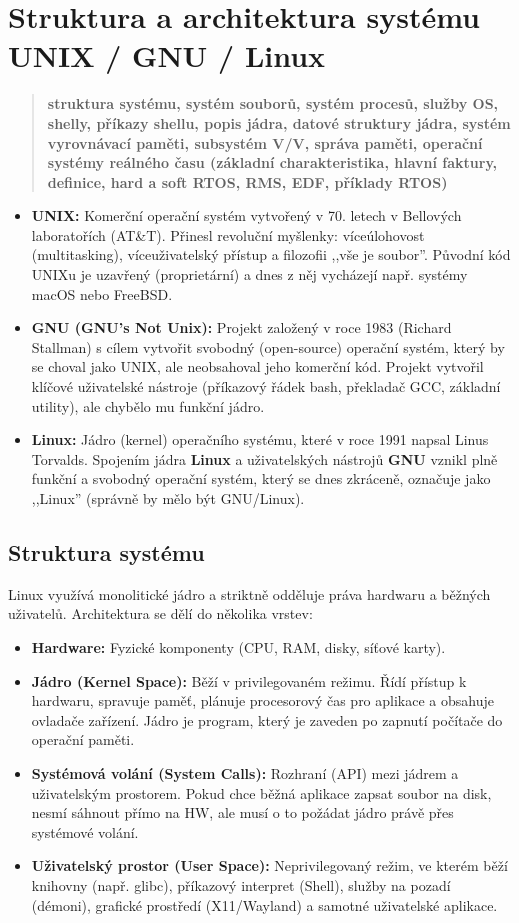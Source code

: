 \section{Struktura a architektura systému UNIX / GNU / Linux}
\begin{quote}
    \textbf{struktura systému, systém souborů, systém procesů, služby OS, shelly, příkazy shellu, popis jádra, datové struktury jádra, systém vyrovnávací paměti, subsystém V/V, správa paměti, operační systémy reálného času (základní charakteristika, hlavní faktury, definice, hard a soft RTOS, RMS, EDF, příklady RTOS)}
\end{quote}
\begin{itemize}
    \item \textbf{UNIX:} Komerční operační systém vytvořený v 70. letech v Bellových laboratořích (AT\&T). Přinesl revoluční myšlenky: víceúlohovost (multitasking), víceuživatelský přístup a filozofii ,,vše je soubor''. Původní kód UNIXu je uzavřený (proprietární) a dnes z něj vycházejí např. systémy macOS nebo FreeBSD.
    \item \textbf{GNU (GNU's Not Unix):} Projekt založený v roce 1983 (Richard Stallman) s cílem vytvořit svobodný (open-source) operační systém, který by se choval jako UNIX, ale neobsahoval jeho komerční kód. Projekt vytvořil klíčové uživatelské nástroje (příkazový řádek bash, překladač GCC, základní utility), ale chybělo mu funkční jádro.
    \item \textbf{Linux:} Jádro (kernel) operačního systému, které v roce 1991 napsal Linus Torvalds.
    Spojením jádra \textbf{Linux} a uživatelských nástrojů \textbf{GNU} vznikl plně funkční a svobodný operační systém, který se dnes zkráceně, označuje jako ,,Linux'' (správně by mělo být GNU/Linux).
\end{itemize}


\subsection{Struktura systému}
Linux využívá monolitické jádro a striktně odděluje práva hardwaru a běžných uživatelů. Architektura se dělí do několika vrstev:
\begin{itemize}
    \item \textbf{Hardware:} Fyzické komponenty (CPU, RAM, disky, síťové karty).
    \item \textbf{Jádro (Kernel Space):} Běží v privilegovaném režimu. Řídí přístup k hardwaru, spravuje paměť, plánuje procesorový čas pro aplikace a obsahuje ovladače zařízení. Jádro je program, který je zaveden po zapnutí počítače do operační paměti.
    \item \textbf{Systémová volání (System Calls):} Rozhraní (API) mezi jádrem a uživatelským prostorem. Pokud chce běžná aplikace zapsat soubor na disk, nesmí sáhnout přímo na HW, ale musí o to požádat jádro právě přes systémové volání.
    \item \textbf{Uživatelský prostor (User Space):} Neprivilegovaný režim, ve kterém běží knihovny (např. glibc), příkazový interpret (Shell), služby na pozadí (démoni), grafické prostředí (X11/Wayland) a samotné uživatelské aplikace.
\end{itemize}

